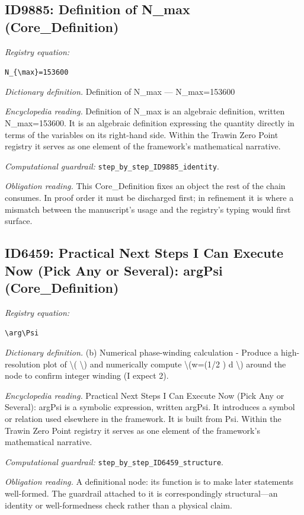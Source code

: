 \documentclass[11pt]{article}
\theoremstyle{remark}
\begin{document}
\subsection{ID9885: Definition of N\_max (Core\_Definition)}

\noindent\textit{Registry equation:}\par
{\small\texttt{N\_\{\textbackslash{}max\}=153600}}\par\medskip
\noindent\textit{Dictionary definition.} Definition of N\_max --- N\_max=153600\par\medskip
\noindent\textit{Encyclopedia reading.} Definition of N\_max is an algebraic definition, written N\_max=153600. It is an algebraic definition expressing the quantity directly in terms of the variables on its right-hand side. Within the Trawin Zero Point registry it serves as one element of the framework's mathematical narrative.
\par\medskip\noindent\textit{Computational guardrail:} \texttt{step\_by\_step\_ID9885\_identity}.
\par\medskip\noindent\textit{Obligation reading.} This Core\_Definition fixes an object the rest of the chain consumes. In proof order it must be discharged first; in refinement it is where a mismatch between the manuscript's usage and the registry's typing would first surface.

\subsection{ID6459: Practical Next Steps I Can Execute Now (Pick Any or Several): argPsi (Core\_Definition)}

\noindent\textit{Registry equation:}\par
{\small\texttt{\textbackslash{}arg\textbackslash{}Psi}}\par\medskip
\noindent\textit{Dictionary definition.} (b) Numerical phase-winding calculation - Produce a high-resolution plot of \textbackslash{}( \textbackslash{}) and numerically compute \textbackslash{}(w=(1/2 ) d \textbackslash{}) around the node to confirm integer winding (I expect 2).\par\medskip
\noindent\textit{Encyclopedia reading.} Practical Next Steps I Can Execute Now (Pick Any or Several): argPsi is a symbolic expression, written argPsi. It introduces a symbol or relation used elsewhere in the framework. It is built from Psi. Within the Trawin Zero Point registry it serves as one element of the framework's mathematical narrative.
\par\medskip\noindent\textit{Computational guardrail:} \texttt{step\_by\_step\_ID6459\_structure}.
\par\medskip\noindent\textit{Obligation reading.} A definitional node: its function is to make later statements well-formed. The guardrail attached to it is correspondingly structural---an identity or well-formedness check rather than a physical claim.
\end{document}
